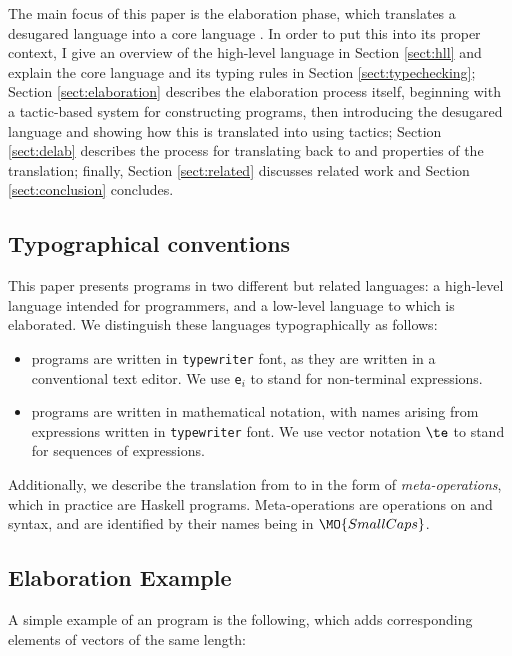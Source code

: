 \noindent
The main focus of this paper is the elaboration phase, which translates
a desugared language \IdrisM{} into a core language \TT{}. In order to put
this into its proper context, I give an overview of the high-level language
\Idris{} in Section \ref{sect:hll} and explain the core language \TT{} and
its typing rules in Section \ref{sect:typechecking}; 
Section \ref{sect:elaboration} describes the elaboration process itself,
beginning with a tactic-based system for constructing
\TT{} programs, then introducing the desugared language \IdrisM{} and
showing how this is translated into \TT{} using tactics;
Section
\ref{sect:delab} describes the process for translating \TT{} back to \Idris{}
and properties of the translation; finally, 
Section \ref{sect:related} discusses related work and Section \ref{sect:conclusion}
concludes.

\subsection{Typographical conventions}

This paper presents programs in two different but related languages: a high-level
language \Idris{} intended for programmers, and a low-level language \TT{} to
which \Idris{} is elaborated. We distinguish these languages typographically as
follows:

\begin{itemize}
\item \Idris{} programs are written in \texttt{typewriter} font, as they are written
in a conventional text editor. We use \texttt{e$_i$} to stand for non-terminal
expressions.
\item \TT{} programs are written in mathematical notation, with names arising
from \Idris{} expressions written in \texttt{typewriter} font. We use vector notation
$\te$ to stand for sequences of expressions.
\end{itemize}

Additionally, we describe the translation from \Idris{} to \TT{} in the form
of \emph{meta-operations}, which in practice are Haskell programs. Meta-operations
are operations on \Idris{} and \TT{} syntax, and are identified by their names being
in $\MO{SmallCaps}$.

\subsection{Elaboration Example}

A simple example of an \Idris{} 
program is the following, which adds corresponding
elements of vectors of the same length:

